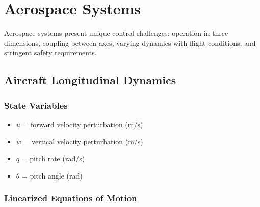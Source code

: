 
\chapter{Aerospace Systems}
\label{ch:aerospace}

Aerospace systems present unique control challenges: operation in three dimensions, coupling between axes, varying dynamics with flight conditions, and stringent safety requirements.

\section{Aircraft Longitudinal Dynamics}
\label{sec:longitudinal}



\subsection{State Variables}

\begin{itemize}
    \item $u$ = forward velocity perturbation (m/s)
    \item $w$ = vertical velocity perturbation (m/s)
    \item $q$ = pitch rate (rad/s)
    \item $\theta$ = pitch angle (rad)
\end{itemize}

\subsection{Linearized Equations of Motion}

